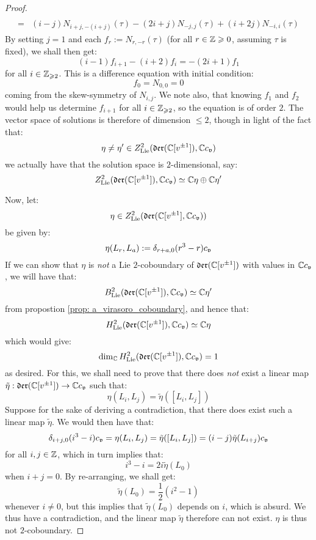 \begin{proof}
$$\begin{aligned}
                            \\
                            = & (i - j)  N_{i + j, -(i + j)}(\tau) - (2i + j) N_{-j, j}(\tau) + (i + 2j) N_{-i, i}(\tau)
                        \end{aligned}
                    $$
                By setting $j = 1$ and each $f_r := N_{r, -r}(\tau)$ (for all $r \in \mathbb{Z} \geqslant 0$, assuming $\tau$ is fixed), we shall then get:
                    $$(i - 1) f_{i + 1} - (i + 2) f_i = -(2i + 1) f_1$$
                for all $i \in \mathbb{Z}_{\geqslant 2}$. This is a difference equation with initial condition:
                    $$f_0 = N_{0, 0} = 0$$
                coming from the skew-symmetry of $N_{i, j}$. We note also, that knowing $f_1$ and $f_2$ would help us determine $f_{i + 1}$ for all $i \in \mathbb{Z}_{\geqslant 2}$, so the equation is of order $2$. The vector space of solutions is therefore of dimension $\leq 2$, though in light of the fact that:
                    $$\eta \not = \eta' \in Z^2_{\mathrm{Lie}}(\mathfrak{der}(\mathbb{C}[v^{\pm 1}]), \mathbb{C} c_{\mathfrak{v}})$$
                we actually have that the solution space is $2$-dimensional, say:
                    $$Z^2_{\mathrm{Lie}}(\mathfrak{der}(\mathbb{C}[v^{\pm 1}]), \mathbb{C} c_{\mathfrak{v}}) \simeq \mathbb{C} \eta \oplus \mathbb{C} \eta'$$
    
                Now, let:
                    $$\eta \in Z^2_{\mathrm{Lie}}(\mathfrak{der}(\mathbb{C}[v^{\pm 1}], \mathbb{C} c_{\mathfrak{v}}))$$
                be given by:
                    $$\eta(L_r, L_a) := \delta_{r + a, 0} (r^3 - r) c_{\mathfrak{v}}$$
                If we can show that $\eta$ is \textit{not} a Lie $2$-coboundary of $\mathfrak{der}(\mathbb{C}[v^{\pm 1}])$ with values in $\mathbb{C} c_{\mathfrak{v}}$, we will have that:
                    $$B^2_{\mathrm{Lie}}(\mathfrak{der}(\mathbb{C}[v^{\pm 1}]), \mathbb{C} c_{\mathfrak{v}}) \simeq \mathbb{C} \eta'$$
                from propostion \ref{prop: a_virasoro_coboundary}, and hence that:
                    $$H^2_{\mathrm{Lie}}(\mathfrak{der}(\mathbb{C}[v^{\pm 1}]), \mathbb{C} c_{\mathfrak{v}}) \simeq \mathbb{C} \eta$$
                which would give:
                    $$\dim_{\mathbb{C}} H^2_{\mathrm{Lie}}(\mathfrak{der}(\mathbb{C}[v^{\pm 1}]), \mathbb{C} c_{\mathfrak{v}}) = 1$$
                as desired. For this, we shall need to prove that there does \textit{not} exist a linear map $\tilde{\eta}: \mathfrak{der}(\mathbb{C}[v^{\pm 1}]) \to \mathbb{C} c_{\mathfrak{v}}$ such that:
                    $$\eta(L_i, L_j) = \tilde{\eta}([L_i, L_j])$$
                Suppose for the sake of deriving a contradiction, that there does exist such a linear map $\tilde{\eta}$. We would then have that:
                    $$\delta_{i + j, 0} (i^3 - i) c_{\mathfrak{v}} = \eta(L_i, L_j) = \tilde{\eta}([L_i, L_j]) = (i - j) \tilde{\eta}(L_{i + j}) c_{\mathfrak{v}}$$
                for all $i, j \in \mathbb{Z}$, which in turn implies that:
                    $$i^3 - i = 2i \tilde{\eta}(L_0)$$
                when $i + j = 0$. By re-arranging, we shall get:
                    $$\tilde{\eta}(L_0) = \frac12(i^2 - 1)$$
                whenever $i \not = 0$, but this implies that $\tilde{\eta}(L_0)$ depends on $i$, which is absurd. We thus have a contradiction, and the linear map $\tilde{\eta}$ therefore can not exist. $\eta$ is thus not $2$-coboundary.
            \end{proof}
